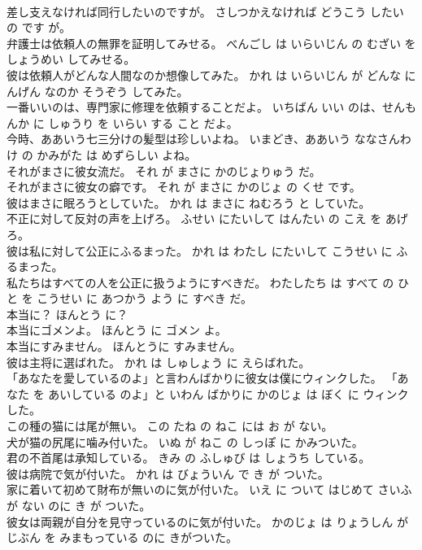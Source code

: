 \documentclass[8pt]{extreport}
\begin{document}
\begin{CJK}{UTF8}{min}
\\	差し支えなければ同行したいのですが。	さしつかえなければ どうこう したい の です が。	
\\	弁護士は依頼人の無罪を証明してみせる。	べんごし は いらいじん の むざい を しょうめい してみせる。	
\\	彼は依頼人がどんな人間なのか想像してみた。	かれ は いらいじん が どんな にんげん なのか そうぞう してみた。	
\\	一番いいのは、専門家に修理を依頼することだよ。	いちばん いい のは、せんもんか に しゅうり を いらい する こと だよ。	
\\	今時、ああいう七三分けの髪型は珍しいよね。	いまどき、ああいう ななさんわけ の かみがた は めずらしい よね。	
\\	それがまさに彼女流だ。	それ が まさに かのじょりゅう だ。	
\\	それがまさに彼女の癖です。	それ が まさに かのじょ の くせ です。	
\\	彼はまさに眠ろうとしていた。	かれ は まさに ねむろう と していた。	
\\	不正に対して反対の声を上げろ。	ふせい にたいして はんたい の こえ を あげろ。	
\\	彼は私に対して公正にふるまった。	かれ は わたし にたいして こうせい に ふるまった。	
\\	私たちはすべての人を公正に扱うようにすべきだ。	わたしたち は すべて の ひと を こうせい に あつかう よう に すべき だ。	
\\	本当に？	ほんとう に？	
\\	本当にゴメンよ。	ほんとう に ゴメン よ。	
\\	本当にすみません。	ほんとうに すみません。	
\\	彼は主将に選ばれた。	かれ は しゅしょう に えらばれた。	
\\	「あなたを愛しているのよ」と言わんばかりに彼女は僕にウィンクした。	「あなた を あいしている のよ」と いわん ばかりに かのじょ は ぼく に ウィンク した。	
\\	この種の猫には尾が無い。	この たね の ねこ には お が ない。	
\\	犬が猫の尻尾に噛み付いた。	いぬ が ねこ の しっぽ に かみついた。	
\\	君の不首尾は承知している。	きみ の ふしゅび は しょうち している。	
\\	彼は病院で気が付いた。	かれ は びょういん で き が ついた。	
\\	家に着いて初めて財布が無いのに気が付いた。	いえ に ついて はじめて さいふ が ない のに き が ついた。	
\\	彼女は両親が自分を見守っているのに気が付いた。	かのじょ は りょうしん が じぶん を みまもっている のに きがついた。	

\end{CJK}
\end{document}

